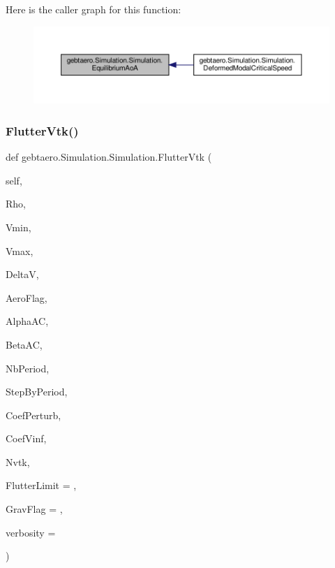 Here is the caller graph for this function\+:
\nopagebreak
\begin{figure}[H]
\begin{center}
\leavevmode
\includegraphics[width=350pt]{classgebtaero_1_1_simulation_1_1_simulation_afd6e42af095216b12f40d6e07a71961e_icgraph}
\end{center}
\end{figure}
\mbox{\label{classgebtaero_1_1_simulation_1_1_simulation_a5c1dd2c7a88c06a76d854aa7ee1830ad}} 
\subsubsection{\texorpdfstring{Flutter\+Vtk()}{FlutterVtk()}}
{\footnotesize\ttfamily def gebtaero.\+Simulation.\+Simulation.\+Flutter\+Vtk (\begin{DoxyParamCaption}\item[{}]{self,  }\item[{}]{Rho,  }\item[{}]{Vmin,  }\item[{}]{Vmax,  }\item[{}]{DeltaV,  }\item[{}]{Aero\+Flag,  }\item[{}]{Alpha\+AC,  }\item[{}]{Beta\+AC,  }\item[{}]{Nb\+Period,  }\item[{}]{Step\+By\+Period,  }\item[{}]{Coef\+Perturb,  }\item[{}]{Coef\+Vinf,  }\item[{}]{Nvtk,  }\item[{}]{Flutter\+Limit = {},  }\item[{}]{Grav\+Flag = {},  }\item[{}]{verbosity = {} }\end{DoxyParamCaption})}



